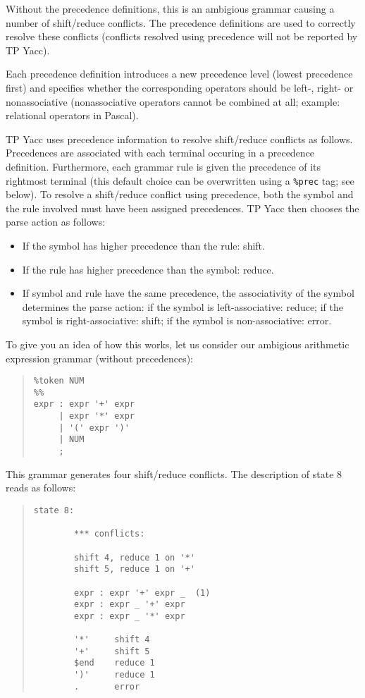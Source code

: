 Without the precedence definitions, this is an ambigious grammar causing
a number of shift/reduce conflicts. The precedence definitions are used
to correctly resolve these conflicts (conflicts resolved using precedence
will not be reported by TP Yacc).

Each precedence definition introduces a new precedence level (lowest
precedence first) and specifies whether the corresponding operators
should be left-, right- or nonassociative (nonassociative operators
cannot be combined at all; example: relational operators in Pascal).

TP Yacc uses precedence information to resolve shift/reduce conflicts as
follows. Precedences are associated with each terminal occuring in a
precedence definition. Furthermore, each grammar rule is given the
precedence of its rightmost terminal (this default choice can be
overwritten using a \verb"%prec" tag; see below). To resolve a shift/reduce
conflict using precedence, both the symbol and the rule involved must
have been assigned precedences. TP Yacc then chooses the parse action
as follows:

\begin{itemize}
   \item
      If the symbol has higher precedence than the rule: shift.
   \item
      If the rule has higher precedence than the symbol: reduce.
   \item
      If symbol and rule have the same precedence, the associativity of the
      symbol determines the parse action: if the symbol is left-associative:
      reduce; if the symbol is right-associative: shift; if the symbol is
      non-associative: error.
\end{itemize}

To give you an idea of how this works, let us consider our ambigious
arithmetic expression grammar (without precedences):

\begin{quote}\begin{verbatim}
%token NUM
%%
expr : expr '+' expr
     | expr '*' expr
     | '(' expr ')'
     | NUM
     ;
\end{verbatim}\end{quote}

This grammar generates four shift/reduce conflicts. The description
of state 8 reads as follows:

\begin{quote}\begin{verbatim}
state 8:

        *** conflicts:

        shift 4, reduce 1 on '*'
        shift 5, reduce 1 on '+'

        expr : expr '+' expr _  (1)
        expr : expr _ '+' expr
        expr : expr _ '*' expr

        '*'     shift 4
        '+'     shift 5
        $end    reduce 1
        ')'     reduce 1
        .       error
\end{verbatim}\end{quote}

